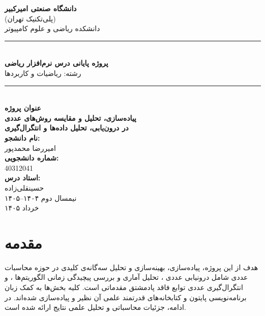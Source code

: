 \documentclass[a4paper,12pt]{article}
\begin{document}
	
	\begin{titlepage}
		\begin{center}
			\vspace*{1cm}
			
			{\Large \textbf{دانشگاه صنعتی امیرکبیر}} \\[0.2cm]
			{\large (پلی‌تکنیک تهران)} \\[0.3cm]
			{\large دانشکده ریاضی و علوم کامپیوتر} \\[1.5cm]
			
			\rule{\textwidth}{1.2pt} \\[0.6cm]
			{\large \textbf{پروژه پایانی درس نرم‌افزار ریاضی}} \\[0.3cm]
			{\large رشته: ریاضیات و کاربردها} \\[0.6cm]
			\rule{\textwidth}{1.2pt} \\[1.8cm]
			
			{\large \textbf{عنوان پروژه}} \\[0.5cm]
			{\LARGE \textbf{پیاده‌سازی، تحلیل و مقایسه روش‌های عددی}} \\[0.3cm]
			{\Large \textbf{در درون‌یابی، تحلیل داده‌ها و انتگرال‌گیری}} \\[2.2cm]
			
			{\large \textbf{نام دانشجو:}} \\[0.3cm]
			{\Large امیررضا محمدپور} \\[0.6cm]
			
			{\large \textbf{شماره دانشجویی:}} \\[0.3cm]
			{\Large 40312041} \\[1cm]
			
			{\large \textbf{استاد درس:}} \\[0.3cm]
			{\Large حسینقلی‌زاده} \\[2cm]
			
			{\large نیمسال دوم ۱۴۰۴--۱۴۰۵} \\[0.3cm]
			{\large خرداد ۱۴۰۵}
			
		\end{center}
	\end{titlepage}
	
	
	\newpage
	\tableofcontents
	\newpage
	
	\section{مقدمه}
	هدف از این پروژه، پیاده‌سازی، بهینه‌سازی و تحلیل سه‌گانه‌ی کلیدی در حوزه محاسبات عددی شامل درونیابی عددی ، تحلیل آماری و بررسی پیچیدگی زمانی الگوریتم‌ها ، و انتگرال‌گیری عددی توابع فاقد پادمشتق مقدماتی  است. کلیه بخش‌ها به کمک زبان برنامه‌نویسی پایتون و کتابخانه‌های قدرتمند علمی آن نظیر  و  پیاده‌سازی شده‌اند. در ادامه، جزئیات محاسباتی و تحلیل علمی نتایج ارائه شده است.
	
\end{document}
